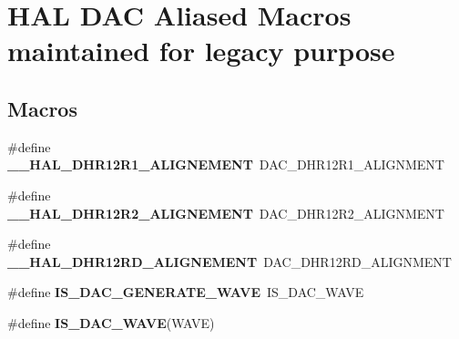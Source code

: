\hypertarget{group___h_a_l___d_a_c___aliased___macros}{\section{H\-A\-L D\-A\-C Aliased Macros maintained for legacy purpose}
\label{group___h_a_l___d_a_c___aliased___macros}
}
\subsection*{Macros}
\begin{DoxyCompactItemize}
\item 
\hypertarget{group___h_a_l___d_a_c___aliased___macros_ga354fd3b8705eea7292d4e4169497da60}{\#define {\bfseries \-\_\-\-\_\-\-H\-A\-L\-\_\-\-D\-H\-R12\-R1\-\_\-\-A\-L\-I\-G\-N\-E\-M\-E\-N\-T}~D\-A\-C\-\_\-\-D\-H\-R12\-R1\-\_\-\-A\-L\-I\-G\-N\-M\-E\-N\-T}\label{group___h_a_l___d_a_c___aliased___macros_ga354fd3b8705eea7292d4e4169497da60}

\item 
\hypertarget{group___h_a_l___d_a_c___aliased___macros_ga2201f928be872705c094e047e49c4b82}{\#define {\bfseries \-\_\-\-\_\-\-H\-A\-L\-\_\-\-D\-H\-R12\-R2\-\_\-\-A\-L\-I\-G\-N\-E\-M\-E\-N\-T}~D\-A\-C\-\_\-\-D\-H\-R12\-R2\-\_\-\-A\-L\-I\-G\-N\-M\-E\-N\-T}\label{group___h_a_l___d_a_c___aliased___macros_ga2201f928be872705c094e047e49c4b82}

\item 
\hypertarget{group___h_a_l___d_a_c___aliased___macros_ga32958593af3de40d27a9944ab91a7255}{\#define {\bfseries \-\_\-\-\_\-\-H\-A\-L\-\_\-\-D\-H\-R12\-R\-D\-\_\-\-A\-L\-I\-G\-N\-E\-M\-E\-N\-T}~D\-A\-C\-\_\-\-D\-H\-R12\-R\-D\-\_\-\-A\-L\-I\-G\-N\-M\-E\-N\-T}\label{group___h_a_l___d_a_c___aliased___macros_ga32958593af3de40d27a9944ab91a7255}

\item 
\hypertarget{group___h_a_l___d_a_c___aliased___macros_ga71522f902db10a227650387b90a0ae45}{\#define {\bfseries I\-S\-\_\-\-D\-A\-C\-\_\-\-G\-E\-N\-E\-R\-A\-T\-E\-\_\-\-W\-A\-V\-E}~I\-S\-\_\-\-D\-A\-C\-\_\-\-W\-A\-V\-E}\label{group___h_a_l___d_a_c___aliased___macros_ga71522f902db10a227650387b90a0ae45}

\item 
\#define {\bfseries I\-S\-\_\-\-D\-A\-C\-\_\-\-W\-A\-V\-E}(W\-A\-V\-E)
\end{DoxyCompactItemize}


